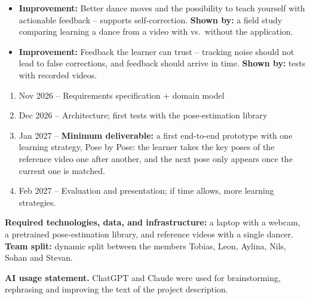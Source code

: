 \documentclass[11pt,a4paper]{article}
\newcommand{\pibapart}[1]{\vspace{0.4em}{\large\textbf{#1}}\par}
\begin{document}
\pibapart{Benefits}
\begin{itemize}
  \item \textbf{Improvement:} Better dance moves and the possibility to teach
  yourself with actionable feedback -- supports self-correction.
  \textbf{Shown by:} a field study comparing learning a dance from a video with
  vs.\ without the application.
  \item \textbf{Improvement:} Feedback the learner can trust -- tracking noise
  should not lead to false corrections, and feedback should arrive in time.
  \textbf{Shown by:} tests with recorded videos.
\end{itemize}

\pibapart{Action}
\begin{enumerate}
  \item Nov 2026 -- Requirements specification + domain model
  \item Dec 2026 -- Architecture; first tests with the pose-estimation library
  \item Jan 2027 -- \textbf{Minimum deliverable:} a first end-to-end prototype
  with one learning strategy, Pose by Pose: the learner takes the key poses of
  the reference video one after another, and the next pose only appears once
  the current one is matched.
  \item Feb 2027 -- Evaluation and presentation; if time allows, more learning strategies.
\end{enumerate}
\textbf{Required technologies, data, and infrastructure:} a laptop with a
webcam, a pretrained pose-estimation library, and reference videos with a
single dancer.\\
\textbf{Team split:} dynamic split between the members Tobias, Leon, Aylina,
Nils, Sohan and Stevan.

\vfill
{\small\textbf{AI usage statement.} ChatGPT and Claude were used for
brainstorming, rephrasing and improving the text of the project description.}
\end{document}
